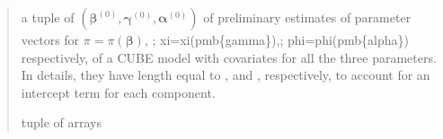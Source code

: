 \documentclass[letterpaper,10pt,english]{sphinxmanual}
\begin{document}
\begin{fulllineitems}
\begin{quote}
\begin{description}
\begin{itemize}
\end{itemize}

\sphinxAtStartPar
a tuple of \((\pmb \beta^{(0)}, \pmb \gamma^{(0)}, \pmb \alpha^{(0)})\) of preliminary estimates of parameter vectors for 
\(\pi = \pi(\pmb{\beta})\), ; xi=xi(pmb\{gamma\}),; phi=phi(pmb\{alpha\})\textasciigrave{} respectively, of a CUBE model with covariates for all the three
parameters. In details, they have length equal to ,  and
, respectively, to account for an intercept term for each component.

\sphinxAtStartPar
tuple of arrays

\end{description}\end{quote}

\end{fulllineitems}

\end{document}

